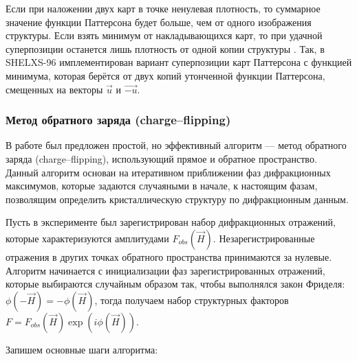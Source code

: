 Если при наложении двух карт в точке ненулевая плотность, то суммарное значение функции Паттерсона будет больше, чем от одного изображения структуры. Если взять минимум от накладывающихся карт, то при удачной суперпозиции останется лишь плотность от одной копии структуры \cite{pavelcik_patterson-oriented_1992}. Так, в SHELXS-96 \cite{sheldrick_patterson_1997} имплементирован вариант суперпозиции карт Паттерсона с функцией минимума, которая берётся от двух копий утонченной функции Паттерсона, смещенных на векторы $\overrightarrow{u}$ и $\overrightarrow{-u}$.
	

\subsubsection{Метод обратного заряда (charge--flipping)}

В работе \cite{oszlanyi_ab_2004} был предложен простой, но эффективный алгоритм --- метод обратного заряда (charge--flipping), использующий прямое и обратное пространство. Данный алгоритм основан на итеративном приближении фаз дифракционных максимумов, которые задаются случаяными в начале, к настоящим фазам, позволящим определить кристаллическую структуру по дифракционным данным.

Пусть в эксперименте был зарегистрирован набор дифракционных отражений, которые характеризуются амплитудами $F_{obs}(\overrightarrow{H})$. Незарегистрированные отражения в других точках обратного пространства принимаются за нулевые. Алгоритм начинается с инициализации фаз зарегистрированных отражений, которые выбираются случайным образом так, чтобы выполнялся закон Фриделя: $\phi(-\overrightarrow{H}) = -\phi(\overrightarrow{H})$, тогда получаем набор структурных факторов $F = F_{obs}(\overrightarrow{H})\exp(i\phi(\overrightarrow{H}))$.

Запишем основные шаги алгоритма:

